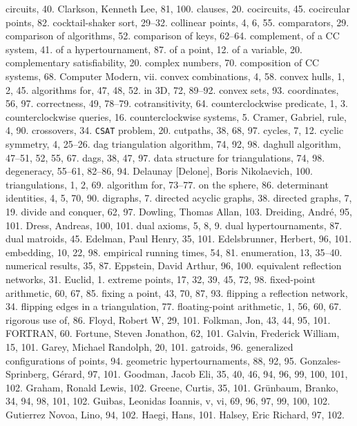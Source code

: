 circuits, 40.
Clarkson, Kenneth Lee, 81, 100.
clauses, 20.
cocircuits, 45.
cocircular points, 82.
cocktail-shaker sort, 29--32.
collinear points, 4, 6, 55.
comparators, 29.
comparison of algorithms, 52.
comparison of keys, 62--64.
complement, of a CC system, 41.
\sub of a hypertournament, 87.
\sub of a point, 12.
\sub of a variable, 20.
complementary satisfiability, 20.
complex numbers, 70.
composition of CC systems, 68.
Computer Modern, vii.
convex combinations, 4, 58.
convex hulls, 1, 2, 45.
\sub algorithms for, 47, 48, 52.
\sub in 3D, 72, 89--92.
convex sets, 93.
coordinates, 56, 97.
correctness, 49, 78--79.
cotransitivity, 64.
counterclockwise predicate, 1, 3.
counterclockwise queries, 16.
counterclockwise systems, 5.
Cramer, Gabriel, rule, 4, 90.
crossovers, 34.
{\tt CSAT} problem, 20.
cutpaths, 38, 68, 97.
cycles, 7, 12.
cyclic symmetry, 4, 25--26.
\medskip
dag triangulation algorithm, 74, 92, 98.
daghull algorithm, 47--51, 52, 55, 67.
dags, 38, 47, 97.
data structure for triangulations, 74, 98.
degeneracy, 55--61, 82--86, 94.
Delaunay [Delone], Boris Nikolaevich, 100.
\sub triangulations, 1, 2, 69.
\subsub algorithm for, 73--77.
\subsub on the sphere, 86.
determinant identities, 4, 5, 70, 90.
digraphs, 7.
directed acyclic graphs, 38.
directed graphs, 7, 19.
divide and conquer, 62, 97.
Dowling, Thomas Allan, 103.
Dreiding, Andr\'e, 95, 101.
Dress, Andreas, 100, 101.
dual axioms, 5, 8, 9.
dual hypertournaments, 87.
dual matroids, 45.
\medskip
Edelman, Paul Henry, 35, 101.
Edelsbrunner, Herbert, 96, 101.
embedding, 10, 22, 98.
empirical running times, 54, 81.
enumeration, 13, 35--40.
\sub numerical results, 35, 87.
Eppstein, David Arthur, 96, 100.
equivalent reflection networks, 31.
Euclid, 1.
extreme points, 17, 32, 39, 45, 72, 98.
\medskip
fixed-point arithmetic, 60, 67, 85.
fixing a point, 43, 70, 87, 93.
flipping a reflection network, 34.
flipping edges in a triangulation, 77.
floating-point arithmetic, 1, 56, 60, 67.
\sub rigorous use of, 86.
Floyd, Robert W, 29, 101.
Folkman, Jon, 43, 44, 95, 101.
{\ninerm FORTRAN}, 60.
Fortune, Steven Jonathon, 62, 101.
\medskip
Galvin, Frederick William, 15, 101.
Garey, Michael Randolph, 20, 101.
gatroids, 96.
generalized configurations of points, 94.
geometric hypertournaments, 88, 92, 95.
Gonzales-Sprinberg, G\'erard, 97, 101.
Goodman, Jacob Eli, 35, 40, 46, 94, 96, 99, 100, 101, 102.
Graham, Ronald Lewis, 102.
Greene, Curtis, 35, 101.
Gr\"unbaum, Branko, 34, 94, 98, 101, 102.
Guibas, Leonidas Ioannis, v, vi, 69, 96, 97, 99, 100, 102.
Gutierrez Novoa, Lino, 94, 102.
\medskip
Haegi, Hans, 101.
Halsey, Eric Richard, 97, 102.
